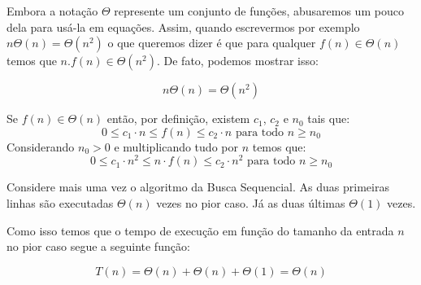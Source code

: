 Embora a notação $\Theta$ represente um conjunto de funções, abusaremos um pouco dela para usá-la em equações.
Assim, quando escrevermos por exemplo $n\Theta(n) = \Theta(n^2)$ o que queremos dizer é que para qualquer $f(n) \in \Theta(n)$ temos que $n.f(n) \in \Theta(n^2)$.
De fato, podemos mostrar isso:

\begin{example}
  \begin{displaymath}
    n\Theta(n) = \Theta(n^2)
  \end{displaymath}

  Se $f(n) \in \Theta(n)$ então, por definição, existem $c_1$, $c_2$ e $n_0$ tais que:
  \begin{displaymath}
    0 \leq c_1 \cdot n \leq f(n) \leq c_2 \cdot n \textrm{ para todo } n \geq n_0
  \end{displaymath}
  Considerando $n_0 > 0$ e multiplicando tudo por $n$ temos que:
    \begin{displaymath}
    0 \leq c_1 \cdot n^2 \leq n \cdot f(n) \leq c_2 \cdot n^2 \textrm{ para todo } n \geq n_0
  \end{displaymath}
\end{example}

Considere mais uma vez o algoritmo da Busca Sequencial.
As duas primeiras linhas são executadas $\Theta(n)$ vezes no pior caso.
Já as duas últimas $\Theta(1)$ vezes.

Como isso temos que o tempo de execução em função do tamanho da entrada $n$ no pior caso segue a seguinte função:

\begin{displaymath}
  T(n) = \Theta(n) + \Theta(n) + \Theta(1) = \Theta(n)
\end{displaymath}


